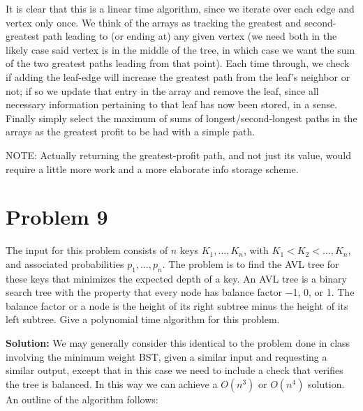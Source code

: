 \documentclass{article}
\providecommand{\prob}[1]{\section*{Problem #1}}
\providecommand{\soln}{\textbf{Solution: }}
\begin{document}
It is clear that this is a linear time algorithm, since we iterate over each edge and vertex only once. We think of the arrays as tracking the greatest and second-greatest path leading to (or ending at) any given vertex (we need both in the likely case said vertex is in the middle of the tree, in which case we want the sum of the two greatest paths leading from that point). Each time through, we check if adding the leaf-edge will increase the greatest path from the leaf's neighbor or not; if so we update that entry in the array and remove the leaf, since all necessary information pertaining to that leaf has now been stored, in a sense. Finally simply select the maximum of sums of longest/second-longest paths in the arrays as the greatest profit to be had with a simple path.

NOTE: Actually returning the greatest-profit path, and not just its value, would require a little more work and a more elaborate info storage scheme.


\pagebreak

\prob{9}
The input for this problem consists of $n$ keys $K_1, \dots , K_n$, with $K_1 < K_2 < \dots , K_n$, and associated probabilities $p_1, \dots , p_n$. The problem is to find the AVL tree for these keys that minimizes the expected depth of a key. An AVL tree is a binary search tree with the property that every node has balance factor −1, 0, or 1. The balance factor or a node is the height of its right subtree minus the height of its left subtree. Give a polynomial time algorithm for this problem.

\soln
We may generally consider this identical to the problem done in class involving the minimum weight BST, given a similar input and requesting a similar output, except that in this case we need to include a check that verifies the tree is balanced. In this way we can achieve a $O(n^3)$ or $O(n^4)$ solution. An outline of the algorithm follows:
\end{document}
